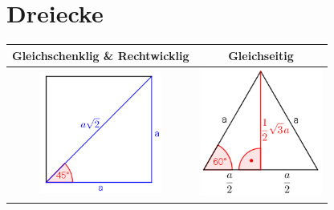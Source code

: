 \section*{Dreiecke}

\begin{tabular}{|c|c|}
\hline 
Gleichschenklig \& Rechtwicklig & Gleichseitig\tabularnewline
\hline 
\hline 
\includegraphics[width=4cm]{Repetition/Gleichschenklig} & \includegraphics[width=4cm]{Repetition/Gleichseitig}\tabularnewline
\hline 
\end{tabular}


